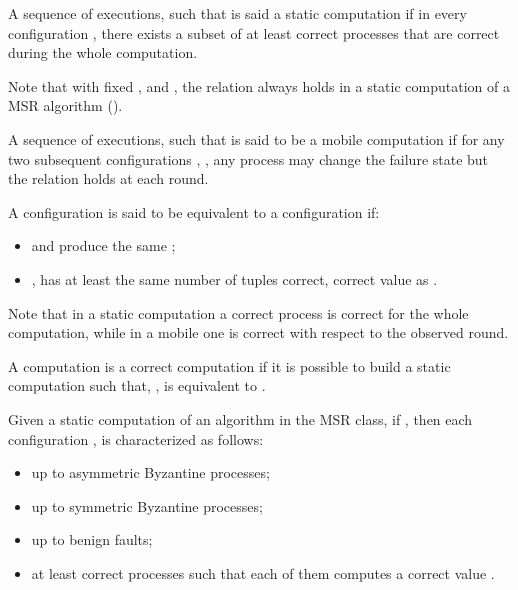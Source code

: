 \begin{definition}
A sequence of   executions, such that   is said a static computation if in every configuration , there exists a subset of at least  correct processes that are correct during the whole computation. 
\end{definition}

Note that  with fixed , and , the relation  always holds in a static computation of a MSR algorithm (\cite{KA94}). 

\begin{definition}
A sequence of   executions, such that   is said to be a mobile computation if for any two subsequent configurations , , any process may change the failure state but the relation  holds at each round. 
\end{definition}

\begin{definition}
A configuration  is said to be equivalent to a configuration  if:
\begin{itemize}
\item  and 
produce the same ;
\item ,  has at least the same number of tuples  correct, correct value  as .
\end{itemize}
Note that in a static computation a correct process is correct for the whole computation, while in a mobile one is correct with respect to the observed round. 
\end{definition}

\begin{definition}
A computation  is a correct computation if it is possible to build a static computation  such that, ,  is equivalent to . 
\end{definition}

\begin{observation}\label{o:correctConf}\cite{KA94}
Given a static computation  of an algorithm in the MSR class, if , then 
each configuration , is characterized as follows:
\begin{itemize}
\item up to  asymmetric Byzantine processes;
\item up to  symmetric Byzantine processes;
\item up to  benign faults;
\item at least  correct processes such that  each  of them computes a correct value .
\end{itemize}
\end{observation}

